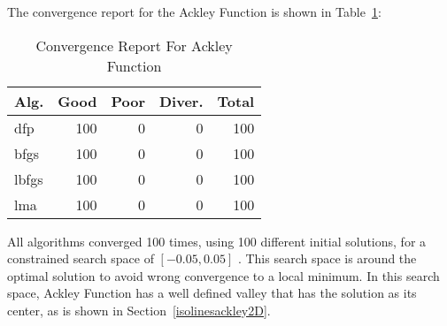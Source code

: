 
The convergence report for the Ackley Function is shown in Table~\ref{convergence:ackley}:

\begin{table}[H]
\centering
\caption{Convergence Report For Ackley Function}
\label{convergence:ackley}
\begin{tabular}{lrrrr}
\toprule
 Alg. &  Good &  Poor &  Diver. &  Total \\
\midrule
  dfp &   100 &     0 &       0 &    100 \\
 bfgs &   100 &     0 &       0 &    100 \\
lbfgs &   100 &     0 &       0 &    100 \\
  lma &   100 &     0 &       0 &    100 \\
\bottomrule
\end{tabular}
\end{table}

All algorithms converged 100 times, using 100 different initial solutions,
for a constrained search space of $\left[-0.05, 0.05\right]$ . This search space is around
the optimal solution to avoid wrong convergence to a local minimum. In this search space,
Ackley Function has a well defined valley that has the solution as its center, as is shown in
Section~\ref{isolinesackley2D}.


